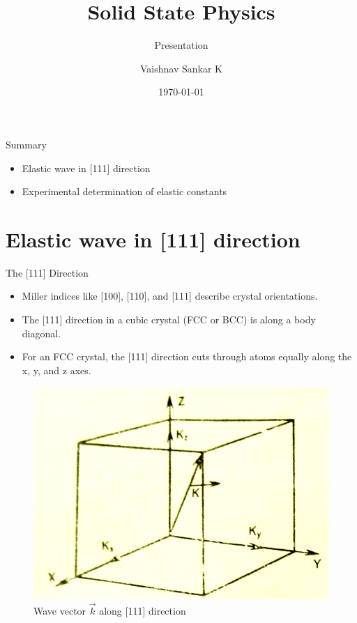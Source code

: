 \documentclass[aspectratio=43]{beamer}
\title{Solid State Physics} %
\subtitle{Presentation}
\author[Vaishnav Sankar K]{Vaishnav Sankar K}
\institute[RIEM]{
    Regional Institute of Education Mysore\\DP190014
} %
\date{\today}
\begin{document}
    
    \frame{\titlepage}
    
    \begin{frame}{Summary}
        \begin{itemize}
        \item Elastic wave in [111] direction
        \item Experimental determination of elastic constants
        \end{itemize}
    \end{frame}
    

\section{Elastic wave in [111] direction}
\begin{frame}{The [111] Direction}
    \begin{itemize}
        \item Miller indices like [100], [110], and [111] describe crystal orientations.
        \item The [111] direction in a cubic crystal (FCC or BCC) is along a body diagonal.
        \item For an FCC crystal, the [111] direction cuts through atoms equally along the x, y, and z axes.
    \end{itemize}
    \begin{figure}
        \centering
        \includegraphics[width=0.5\linewidth]{images/2.png}
        \caption{Wave vector $\vec{k}$ along [111] direction}
    \end{figure}
\end{frame}
\end{document}
